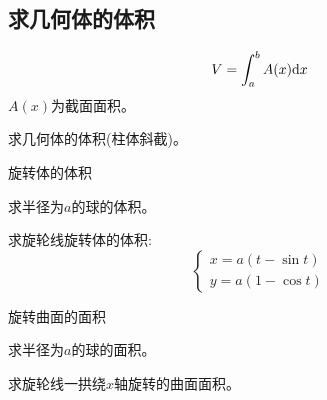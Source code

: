 \subsection{求几何体的体积}
\begin{equation*}
    V = \int_a^b A(x) \mathrm{d} x
\end{equation*}
$A(x)$为截面面积。

\begin{example}
    求几何体的体积(柱体斜截)。
\end{example}
\begin{solution}
    
\end{solution}

\begin{example}
    旋转体的体积
\end{example}
\begin{solution}
    
\end{solution}

\begin{example}
    求半径为$a$的球的体积。
\end{example}
\begin{solution}
    
\end{solution}

\begin{example}
    求旋轮线旋转体的体积:
    \begin{equation*}
        \begin{cases}
            x = a(t-\sin t) \\
            y = a(1 - \cos t)
        \end{cases}
    \end{equation*}
\end{example}
\begin{solution}
    
\end{solution}

\begin{example}
    旋转曲面的面积
\end{example}
\begin{solution}
    
\end{solution}

\begin{example}
    求半径为$a$的球的面积。
\end{example}
\begin{solution}
    
\end{solution}

\begin{example}
    求旋轮线一拱绕$x$轴旋转的曲面面积。
\end{example}
\begin{solution}
    
\end{solution}